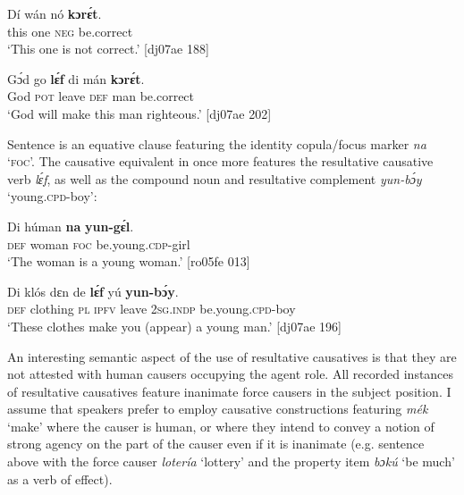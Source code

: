 \ea%
    \label{ex:key:1336}
    \gll Dí  wán    nó  \textbf{kɔrɛ́t}.\\
this  one    \textsc{neg}  be.correct\\

\glt ‘This one is not correct.’ [dj07ae 188]
\z


\ea%
    \label{ex:key:1337}
    \gll Gɔ́d  go  \textbf{lɛ́f}    di  mán    \textbf{kɔrɛ́t}.\\
God  \textsc{pot}  leave  \textsc{def}  man    be.correct\\

\glt ‘God will make this man righteous.’ [dj07ae 202]
\z

Sentence  is an equative clause{\fff} featuring the identity copula/focus marker \textit{na} ‘\textsc{foc}’. The causative equivalent in  once more features the resultative causative verb \textit{lɛ́f}, as well as the compound noun and resultative complement \textit{yun-bɔ́y} ‘young.\textsc{cpd}-boy’:


\ea%
    \label{ex:key:1338}
    \gll Di  húman  \textbf{na}  \textbf{yun-gɛ́l}.\\
\textsc{def}  woman  \textsc{foc}  be.young.\textsc{cdp}{}-girl\\

\glt ‘The woman is a young woman.’ [ro05fe 013]
\z


\ea%
    \label{ex:key:1339}
    \gll Di  klós    dɛn  de  \textbf{lɛ́f}    yú    \textbf{yun-bɔ́y}.\\
\textsc{def}  clothing  \textsc{pl}  \textsc{ipfv}  leave  \textsc{2sg.indp}  be.young\textsc{.cpd}{}-boy\\

\glt ‘These clothes make you (appear) a young man.’ [dj07ae 196]
\z

An interesting semantic aspect of the use of resultative causatives is that they are not attested with human causers occupying the agent role. All recorded instances of resultative causatives feature inanimate force causers in the subject position. I assume that speakers prefer to employ causative constructions featuring \textit{mék} ‘make’ where the causer is human, or where they intend to convey a notion of strong agency on the part of the causer even if it is inanimate (e.g. sentence  above with the force causer \textit{lotería} ‘lottery’ and the property item \textit{b}\textit{ɔ}\textit{kú} ‘be much’ as a verb of effect).


